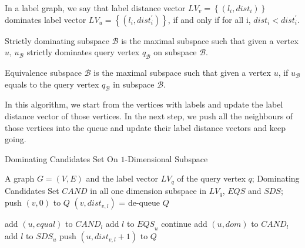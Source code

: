 \begin{definition}
In a label graph, we say that label distance vector $LV_v=\left\{(l_i, dist_i)\right\}$ dominates label vector $LV_u=\left\{(l_i, dist_i^\prime)\right\}$, if and only if for all i, $dist_i < dist_i^\prime$.
\end{definition}

\begin{definition}
Strictly dominating subspace $\mathcal{B}$ is the maximal subspace such that given a vertex $u$, $u_\mathcal{B}$ strictly dominates query vertex $q_\mathcal{B}$ on subspace $\mathcal{B}$.
\end{definition}

\begin{definition}
Equivalence subspace $\mathcal{B}$ is the maximal subspace such that given a vertex $u$, if $u_\mathcal{B}$ equals to the query vertex $q_\mathcal{B}$ in subspace $\mathcal{B}$.
\end{definition}

In this algorithm, we start from the vertices with labels and update the label distance vector of those vertices. In the next step, we push all the neighbours of those vertices into the queue and update their label distance vectors and keep going. 
\begin{algorithm}[h]
  \caption{Dominating Candidates Set On $1$-Dimensional Subspace}\label{algo:blah}
  \begin{algorithmic}[1]
  \show\LOOP
    \REQUIRE A graph $G=(V,E)$ and the label vector $LV_q$ of the query vertex $q$;
    \ENSURE Dominating Candidates Set $\mathit{CAND}$ in all one dimension subspace in $LV_q$, $\mathit{EQS}$ and $\mathit{SDS}$;
            \STATE push $\left(v, 0\right)$ to $Q$
        \ENDFOR
    \ENDFOR
            \STATE $\left(v, dist_{v,l}\right)$ = de-queue $Q$
            
                \STATE add $\left(u, equal\right)$ to $\mathit{CAND}_l$
                \STATE add $l$ to $\mathit{EQS}_u$
                \STATE continue
            \ENDIF
            \STATE add $\left(u, dom\right)$ to $\mathit{CAND}_l$
            \STATE add $l$ to $\mathit{SDS}_u$
                \STATE push $\left(u, dist_{v,l}+1\right)$ to $Q$
            \ENDFOR
        \ENDFOR
    \ENDWHILE
  \end{algorithmic}
\end{algorithm}

